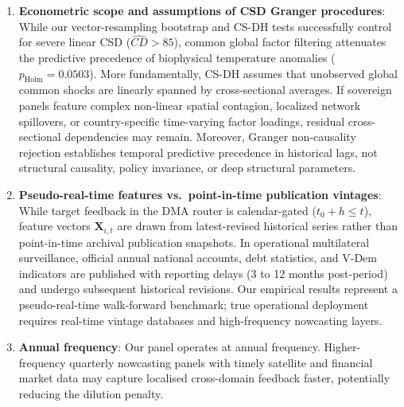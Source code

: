\documentclass[11pt,a4paper]{article}
\begin{document}
\begin{enumerate}[leftmargin=*, label=\arabic*.]
    \item \textbf{Econometric scope and assumptions of CSD Granger procedures}: While our vector-resampling bootstrap and CS-DH tests successfully control for severe linear CSD ($\hat{CD} > 85$), common global factor filtering attenuates the predictive precedence of biophysical temperature anomalies ($p_{\text{Holm}} = 0.0503$). More fundamentally, CS-DH assumes that unobserved global common shocks are linearly spanned by cross-sectional averages. If sovereign panels feature complex non-linear spatial contagion, localized network spillovers, or country-specific time-varying factor loadings, residual cross-sectional dependencies may remain. Moreover, Granger non-causality rejection establishes temporal predictive precedence in historical lags, not structural causality, policy invariance, or deep structural parameters.
    \item \textbf{Pseudo-real-time features vs.\ point-in-time publication vintages}: While target feedback in the DMA router is calendar-gated ($t_0 + h \le t$), feature vectors $\mathbf{X}_{i,t}$ are drawn from latest-revised historical series rather than point-in-time archival publication snapshots. In operational multilateral surveillance, official annual national accounts, debt statistics, and V-Dem indicators are published with reporting delays (3 to 12 months post-period) and undergo subsequent historical revisions. Our empirical results represent a pseudo-real-time walk-forward benchmark; true operational deployment requires real-time vintage databases and high-frequency nowcasting layers.
    \item \textbf{Annual frequency}: Our panel operates at annual frequency. Higher-frequency quarterly nowcasting panels with timely satellite and financial market data may capture localised cross-domain feedback faster, potentially reducing the dilution penalty.


\end{enumerate}
\end{document}
